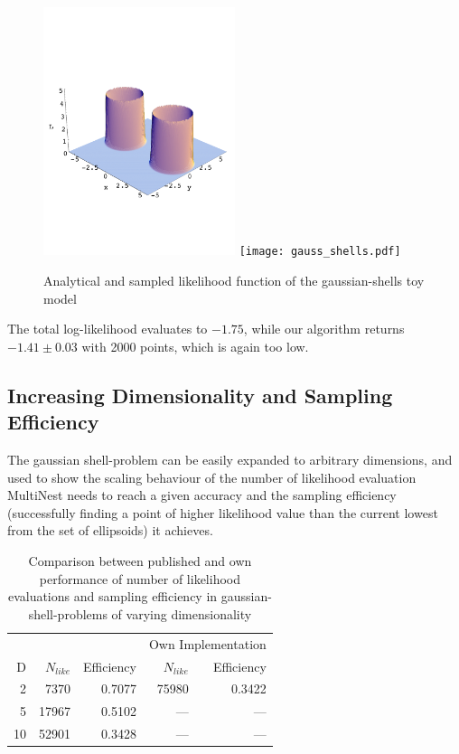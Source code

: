\documentclass{article}
\begin{document}
\begin{figure}[h]
\includegraphics[width=0.5\textwidth]{gauss_shells_analytic.pdf}
\texttt{[image: gauss\_shells.pdf]}
\caption{Analytical and sampled likelihood function of the gaussian-shells toy model}
\label{gaussshell}
\end{figure}

The total log-likelihood evaluates to $-1.75$, while our algorithm returns $-1.41\pm 0.03$  with 2000 points, which is again too low.

\subsection{Increasing Dimensionality and Sampling Efficiency}
The gaussian shell-problem can be easily expanded to arbitrary dimensions, and used to show the scaling behaviour of the number of likelihood evaluation MultiNest needs to reach a given accuracy and the sampling efficiency (successfully finding a point of higher likelihood value than the current lowest from the set of ellipsoids) it achieves.
\begin{table}\label{tab:NlikeEff}
\centering
\begin{tabular}{rrrrr}
\hline
&\multicolumn{2}{c}{\cite{2009MNRAS.398.1601F}} &\multicolumn{2}{c}{Own Implementation} \\
D&$N_{like}$ & Efficiency & $N_{like}$ & Efficiency \\ \hline
 2 &  7370 & 0.7077 & 75980 & 0.3422 \\
 5 & 17967 & 0.5102 &  ---  &  ---   \\
10 & 52901 & 0.3428 &  ---  &  ---   \\ \hline
\end{tabular}
\caption{Comparison between published and own performance of number of likelihood evaluations and sampling efficiency in gaussian-shell-problems of varying dimensionality}
\end{table}
\end{document}
